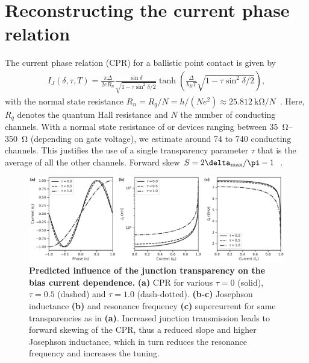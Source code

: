 \section{Reconstructing the current phase relation}

The current phase relation (CPR) for a ballistic point contact is given by
%
\begin{align}
I_J(\delta,\tau,T) = \frac{\pi\Delta}{2 e R_n} \frac{\sin\delta}{\sqrt{1 - \tau \sin^2\delta / 2}} \tanh\left(\frac{\Delta}{k_B T} \sqrt{1 - \tau \sin^2\delta / 2}\right),
\label{eq:CPR-ball}
\end{align}
%
with the normal state resistance $R_n= R_q/N = h/(Ne^2)\approx \SI{25.812}{\kilo\ohm} / N$~\cite{golubovCurrentphaseRelationJosephson2004a}.
%
Here, $R_q$ denotes the quantum Hall resistance and $N$ the number of conducting channels.
%
With a normal state resistance of or devices ranging between \SIrange{35}{350}{\ohm} (depending on gate voltage), we estimate around 74 to 740 conducting channels.
%
This justifies the use of a single transparency parameter $\tau$ that is the average of all the other channels.
%
Forward skew $S=2\delta_{\rm max}/\pi -1$~\cite{englishObservationNonsinusoidalCurrentphase2016}.
%
%

\begin{figure}
	\centering
	\includegraphics[width=\linewidth]{chapter-gJJ-CPR/figs/Figure5}
	\caption{
		\textbf{Predicted influence of the junction transparency on the bias current dependence.}
		\textbf{(a)} CPR for various $\tau=0$ (solid), $\tau=0.5$ (dashed) and $\tau=1.0$	(dash-dotted).
		\textbf{(b-c)} Josephson inductance \textbf{(b)} and resonance frequency \textbf{(c)} supercurrent for	same transparencies as in \textbf{(a)}.
		Increased junction transmission leads to forward skewing of the CPR, thus a reduced slope and higher Josephson inductance, which in turn reduces the resonance frequency and increases the tuning.
	}
	\label{fig:figure5}
\end{figure}


